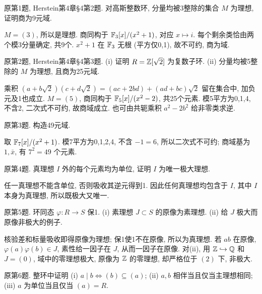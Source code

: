 \begin{exercise}原第1题, Herstein第4章\S4第2题. 对高斯整数环, 分量均被3整除的集合 $M$ 为理想, 证明商为9元域.\end{exercise}
\begin{solution}
$M=(3)$, 所以是理想. 商同构于 $\mathbb F_3[x]/(x^2+1)$, 对应 $x\mapsto i$. 每个剩余类恰由两个模3分量确定, 共9个. $x^2+1$ 在 $\mathbb F_3$ 无根 (平方仅0,1), 故不可约, 商为域.
\end{solution}
\begin{exercise}原第2题, Herstein第4章\S4第3题. (i) 证明 $R=\mathbb Z[\sqrt2]$ 为复数子环. (ii) 分量均被5整除的 $M$ 为理想, 且商为25元域.\end{exercise}
\begin{solution}
乘积 $(a+b\sqrt2)(c+d\sqrt2)=(ac+2bd)+(ad+bc)\sqrt2$ 留在集合中, 加负元及1也成立. $M=(5)$, 商同构于 $\mathbb F_5[x]/(x^2-2)$, 共25个元素. 模5平方为0,1,4, 不含2, 二次式不可约, 故商域成立. 也可由共轭乘积 $a^2-2b^2$ 给非零类求逆.
\end{solution}
\begin{exercise}原第3题. 构造49元域.\end{exercise}
\begin{solution}
取 $\mathbb F_7[x]/(x^2+1)$. 模7平方为0,1,2,4, 不含 $-1=6$, 所以二次式不可约; 商域基为 $1,\bar x$, 有 $7^2=49$ 个元素.
\end{solution}
\begin{exercise}原第4题. 真理想 $I$ 外的每个元素均为单位, 证明 $I$ 为唯一极大理想.\end{exercise}
\begin{solution}
任一真理想不能含单位, 否则吸收其逆元得到1. 因此任何真理想均包含于 $I$, 其中 $I$ 本身为真理想, 所以既极大又唯一.
\end{solution}
\begin{exercise}原第5题. 环同态 $\varphi:R\to S$ 保1. (i) 素理想 $J\subset S$ 的原像为素理想. (ii) 给 $J$ 极大而原像非极大的例子.\end{exercise}
\begin{solution}
核验差和标量吸收即得原像为理想; 保1使1不在原像, 所以为真理想. 若 $ab$ 在原像, $\varphi(a)\varphi(b)\in J$, 素性给一因子在 $J$, 从而一因子在原像. 对(ii), 用 $\mathbb Z\hookrightarrow\mathbb Q$ 和 $J=(0)$, 域中的零理想极大, 原像为 $\mathbb Z$ 的零理想, 却严格位于 $(2)$ 下, 非极大.
\end{solution}
\begin{exercise}原第6题. 整环中证明 (i) $a\mid b\iff(b)\subseteq(a)$; (ii) $a,b$ 相伴当且仅当主理想相同; (iii) $a$ 为单位当且仅当 $(a)=R$.\end{exercise}
